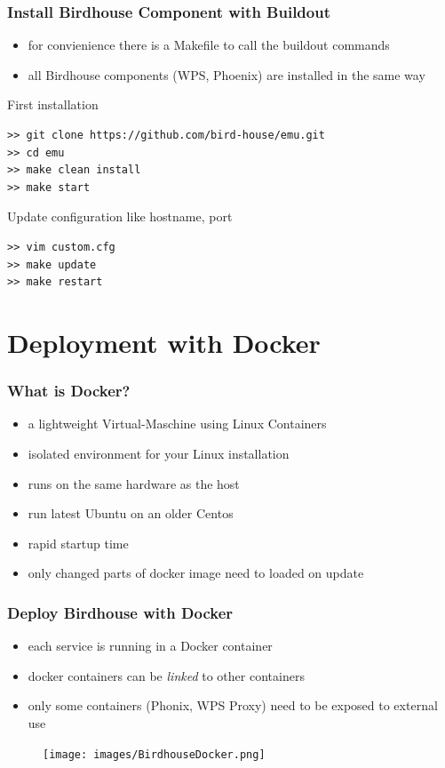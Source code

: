 \documentclass{beamer}
\begin{document}
  \begin{frame}[fragile]
    \frametitle{Install Birdhouse Component with Buildout}
    \begin{itemize}
      \item for convienience there is a Makefile to call the buildout commands
      \item all Birdhouse components (WPS, Phoenix) are installed in the same way
    \end{itemize}
    \begin{block}{First installation}
      \begin{verbatim}
>> git clone https://github.com/bird-house/emu.git  
>> cd emu
>> make clean install
>> make start
      \end{verbatim}
    \end{block}
\begin{block}{Update configuration like hostname, port}
      \begin{verbatim}
>> vim custom.cfg   
>> make update
>> make restart
      \end{verbatim}
    \end{block}
\end{frame}

  \section{Deployment with Docker}


  \begin{frame}
    \frametitle{What is Docker?}
    \begin{itemize}
      \item a lightweight Virtual-Maschine using Linux Containers
      \item isolated environment for your Linux installation
      \item runs on the same hardware as the host
      \item run latest Ubuntu on an older Centos
      \item rapid startup time
      \item only changed parts of docker image need to loaded on update
    \end{itemize}
  \end{frame}


  \begin{frame}[plain]
    \frametitle{Deploy Birdhouse with Docker}
    \begin{itemize}
      \item each service is running in a Docker container
      \item docker containers can be \emph{linked} to other containers
      \item only some containers (Phonix, WPS Proxy) need to be exposed to external use
    \end{itemize}
    \begin{figure}
      \texttt{[image: images/BirdhouseDocker.png]}
    \end{figure}
  \end{frame}
\end{document}
